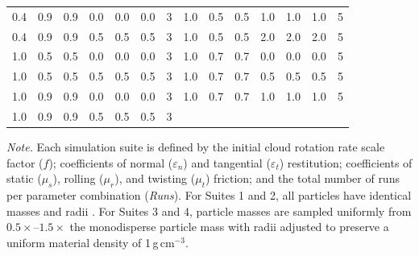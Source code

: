 \documentclass[fleqn,usenatbib]{mnras}
\begin{document}
\begin{table}
\begin{tabular}{ccccccc|ccccccc}
        0.4 & 0.9 & 0.9 & 0.0 & 0.0 & 0.0 & 3 & 1.0 & 0.5 & 0.5 & 1.0 & 1.0 & 1.0 & 5 \\
        0.4 & 0.9 & 0.9 & 0.5 & 0.5 & 0.5 & 3 & 1.0 & 0.5 & 0.5 & 2.0 & 2.0 & 2.0 & 5 \\
        1.0 & 0.5 & 0.5 & 0.0 & 0.0 & 0.0 & 3 & 1.0 & 0.7 & 0.7 & 0.0 & 0.0 & 0.0 & 5 \\
        1.0 & 0.5 & 0.5 & 0.5 & 0.5 & 0.5 & 3 & 1.0 & 0.7 & 0.7 & 0.5 & 0.5 & 0.5 & 5 \\
        1.0 & 0.9 & 0.9 & 0.0 & 0.0 & 0.0 & 3 & 1.0 & 0.7 & 0.7 & 1.0 & 1.0 & 1.0 & 5 \\
        1.0 & 0.9 & 0.9 & 0.5 & 0.5 & 0.5 & 3 & \multicolumn{7}{c}{} \\
        \hline
    \end{tabular}
    \newline
    \vspace{4pt}
    \begin{minipage}{\linewidth}
        \small\textit{Note.} Each simulation suite is defined by the initial cloud rotation rate scale factor ($f$); coefficients of normal ($\varepsilon_n$) and tangential ($\varepsilon_t$) restitution; coefficients of static ($\mu_s$), rolling ($\mu_r$), and twisting ($\mu_t$) friction; and the total number of runs per parameter combination (\textit{Runs}). For Suites 1 and 2, all particles have identical masses and radii \citep{Barnes2025}. For Suites 3 and 4, particle masses are sampled uniformly from $0.5\times$--$1.5\times$ the monodisperse particle mass with radii adjusted to preserve a uniform material density of 1\,g\,cm$^{-3}$.
    \end{minipage}
\end{table}

\end{document}
